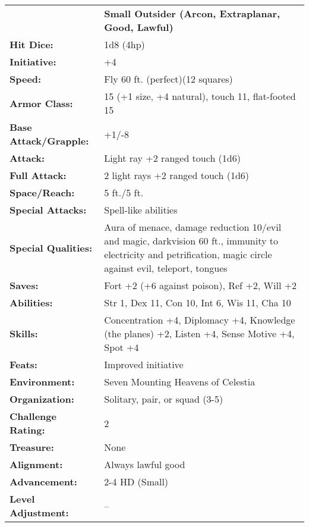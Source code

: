 \documentclass[../main.tex]{subfiles}
\begin{document}
  \begin{table}[H]
    \centering
    \begin{tabular}{lp{12em}}
       & \textbf{Small Outsider (Arcon, Extraplanar, Good, Lawful)} \\
       \textbf{Hit Dice:} & 1d8 (4hp) \\
       \textbf{Initiative:} & +4 \\
       \textbf{Speed:} & Fly 60 ft. (perfect)(12 squares) \\
       \textbf{Armor Class:} & 15 (+1 size, +4 natural), touch 11, flat-footed 15 \\
       \textbf{Base Attack/Grapple:} & +1/-8 \\
       \textbf{Attack:} & Light ray +2 ranged touch (1d6) \\
       \textbf{Full Attack:} & 2 light rays +2 ranged touch (1d6) \\
       \textbf{Space/Reach:} & 5 ft./5 ft. \\
       \textbf{Special Attacks:} & Spell-like abilities \\
       \textbf{Special Qualities:} & Aura of menace, damage reduction 10/evil and magic, darkvision 60 ft., immunity to electricity and petrification, magic circle against evil, teleport, tongues \\
       \textbf{Saves:} & Fort +2 (+6 against poison), Ref +2, Will +2 \\
       \textbf{Abilities:} & Str 1, Dex 11, Con 10, Int 6, Wis 11, Cha 10 \\
       \textbf{Skills:} & Concentration +4, Diplomacy +4, Knowledge (the planes) +2, Listen +4, Sense Motive +4, Spot +4 \\
       \textbf{Feats:} & Improved initiative \\
       \textbf{Environment:} & Seven Mounting Heavens of Celestia \\
       \textbf{Organization:} & Solitary, pair, or squad (3-5) \\
       \textbf{Challenge Rating:} & 2 \\
       \textbf{Treasure:} & None \\
       \textbf{Alignment:} & Always lawful good \\
       \textbf{Advancement:} & 2-4 HD (Small) \\
       \textbf{Level Adjustment:} & -- \\
    \end{tabular}
  \end{table}
\end{document}
